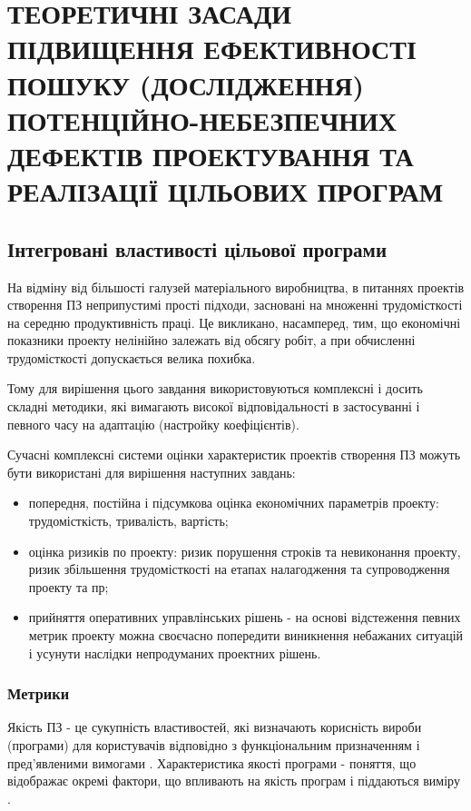 \chapter{ТЕОРЕТИЧНІ ЗАСАДИ ПІДВИЩЕННЯ ЕФЕКТИВНОСТІ ПОШУКУ (ДОСЛІДЖЕННЯ) ПОТЕНЦІЙНО-НЕБЕЗПЕЧНИХ ДЕФЕКТІВ ПРОЕКТУВАННЯ ТА РЕАЛІЗАЦІЇ ЦІЛЬОВИХ ПРОГРАМ}
\label{2section::doc}\label{2section:id1}

\section{Інтегровані властивості цільової програми}
\label{2section:id2}
На відміну від більшості галузей матеріального виробництва, в питаннях проектів створення ПЗ неприпустимі прості підходи, засновані на множенні трудомісткості на середню продуктивність праці. Це викликано, насамперед, тим, що економічні показники проекту нелінійно залежать від обсягу робіт, а при обчисленні трудомісткості допускається велика похибка.

Тому для вирішення цього завдання використовуються комплексні і досить складні методики, які вимагають високої відповідальності в застосуванні і певного часу на адаптацію (настройку коефіцієнтів).

Сучасні комплексні системи оцінки характеристик проектів створення ПЗ можуть бути використані для вирішення наступних завдань:
\begin{itemize}
\item {} 
попередня, постійна і підсумкова оцінка економічних параметрів проекту: трудомісткість, тривалість, вартість;

\item {} 
оцінка ризиків по проекту: ризик порушення строків та невиконання проекту, ризик збільшення трудомісткості на етапах налагодження та супроводження проекту та пр;

\item {} 
прийняття оперативних управлінських рішень - на основі відстеження певних метрик проекту можна своєчасно попередити виникнення небажаних ситуацій і усунути наслідки непродуманих проектних рішень.

\end{itemize}


\subsection{Метрики}
\label{2section:id3}
Якість ПЗ - це сукупність властивостей, які визначають корисність вироби (програми) для користувачів відповідно з функціональним призначенням і пред'явленими вимогами .
Характеристика якості програми - поняття, що відображає окремі фактори, що впливають на якість програм і піддаються виміру .

